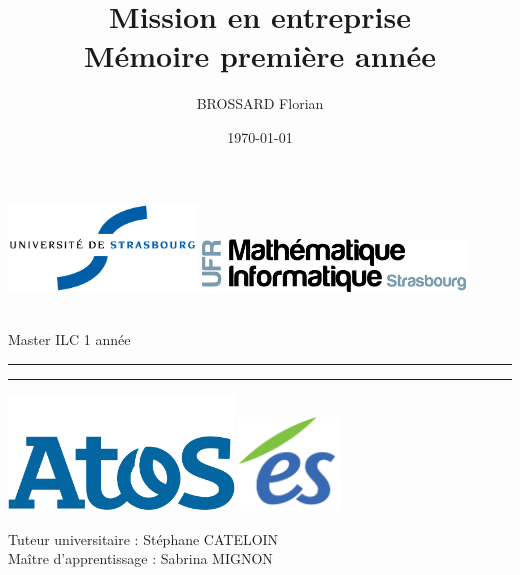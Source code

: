 \documentclass[12pt]{report}
\title{Mission en entreprise \\ Mémoire première année}
\author{BROSSARD Florian}
\date{\today}
\newcommand{\schoolyear}{Master ILC 1\iere{} année}
\def\thanks{
    Tuteur universitaire : Stéphane CATELOIN\\
    Maître d'apprentissage : Sabrina MIGNON
}
\begin{document}
    
    \makeatletter
    \begin{titlepage}
		\enlargethispage{2cm}
		\begin{center}
			\includegraphics[width = 50mm]{img/unistra.jpg} \hfill
			\includegraphics[width = 70mm]{img/logoUFRMath.png} 
		\end{center}
		
		\begin{center}
			\vspace*{3cm}
			\LARGE{\@author\\}
			\large{\schoolyear \\ \@date}
			\vspace*{1cm}
			\hrule
			\vspace*{0.5em}
			\textsc{\LARGE{ \@title }}
			\vspace*{1em}
			\hrule
		\end{center}
		\begin{center}
			\vspace{1.5cm}
			\includegraphics[width = 60mm]{img/atos.png} \hfill
			\includegraphics[height = 25mm]{img/es.jpg} \\
			\vspace{2cm}
			\thanks
		\end{center}
	\end{titlepage}
    \makeatother
    
    \listoftodos\thispagestyle{empty}
    \newpage
    
\end{document}
